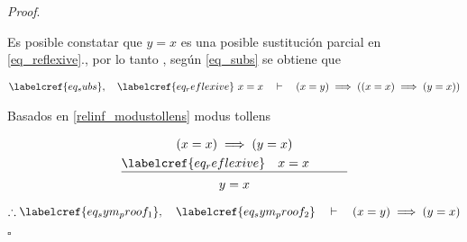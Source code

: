 \textit{Proof}. 

Es posible constatar que $y = x$ es una  posible sustitución parcial en \cref{eq_reflexive}., por lo tanto , según \cref{eq_subs} se obtiene que

\begin{equation} \label{eq_sym_proof_1}
\begin{gathered}
	\labelcref{eq_subs} , \quad \labelcref{eq_reflexive}\ x=x \quad \vdash \quad (x = y) \implies ((x = x) \implies (y=x))
\end{gathered}
\end{equation}

Basados en \cref{relinf_modustollens}  modus tollens

\begin{equation} \label{eq_sym_proof_2}
\begin{gathered}
	(x = x) \implies (y=x) \\
	\underline{\labelcref{eq_reflexive} \quad x=x \quad \quad \quad} \\
	y = x
\end{gathered}
\end{equation}

\begin{equation}
	\therefore \labelcref{eq_sym_proof_1} , \quad \labelcref{eq_sym_proof_2} \quad \vdash \quad (x = y) \implies (y = x)
\end{equation}

\hfill $\square$